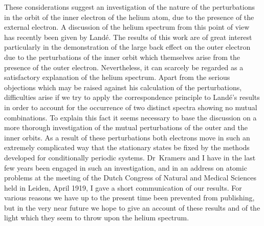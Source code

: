 These considerations suggest an investigation of the nature of
the perturbations in the orbit of the inner electron of the helium
atom, due to the presence of the external electron. A discussion
of the helium spectrum from this point of view has recently been
given by Landé. The results of this work are of great interest particularly
in the demonstration of the large back effect on the outer
electron due to the perturbations of the inner orbit which themselves
arise from the presence of the outer electron. Nevertheless, it can
scarcely be regarded as a satisfactory explanation of the helium
spectrum. Apart from the serious objections which may be raised
against his calculation of the perturbations, difficulties arise if we
try to apply the correspondence principle to Landé's results in
order to account for the occurrence of two distinct spectra showing
no mutual combinations. To explain this fact it seems necessary
to base the discussion on a more thorough investigation of the
mutual perturbations of the outer and the inner orbits. As a
result of these perturbations both electrons move in such an
extremely complicated way that the stationary states  be
fixed by the methods developed for conditionally periodic systems.
Dr~Kramers and I have in the last few years been engaged in such
an investigation, and in an address on atomic problems at the
meeting of the Dutch Congress of Natural and Medical Sciences
held in Leiden, April 1919, I gave a short communication of our
results. For various reasons we have up to the present time been
prevented from publishing, but in the very near future we hope to
give an account of these results and of the light which they seem
to throw upon the helium spectrum.


